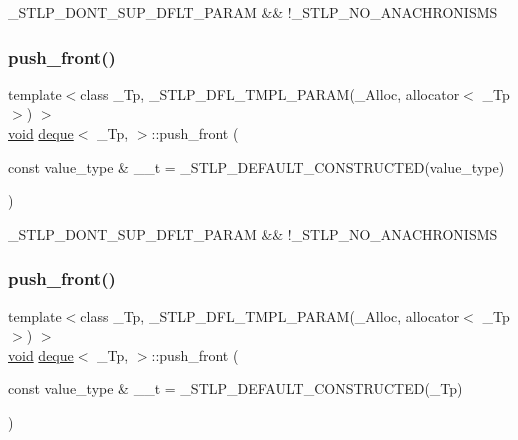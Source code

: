 \+\_\+\+S\+T\+L\+P\+\_\+\+D\+O\+N\+T\+\_\+\+S\+U\+P\+\_\+\+D\+F\+L\+T\+\_\+\+P\+A\+R\+AM \&\& !\+\_\+\+S\+T\+L\+P\+\_\+\+N\+O\+\_\+\+A\+N\+A\+C\+H\+R\+O\+N\+I\+S\+MS \mbox{\label{classdeque_acb102fac10501dc695a496beca93a9da}} 
\subsubsection{\texorpdfstring{push\+\_\+front()}{push\_front()}\hspace{0.1cm}{\footnotesize\ttfamily [1/2]}}
{\footnotesize\ttfamily template$<$class \+\_\+\+Tp, \+\_\+\+S\+T\+L\+P\+\_\+\+D\+F\+L\+\_\+\+T\+M\+P\+L\+\_\+\+P\+A\+R\+A\+M(\+\_\+\+Alloc, allocator$<$ \+\_\+\+Tp $>$) $>$ \\
\hyperlink{interfacevoid}{void} \hyperlink{classdeque}{deque}$<$ \+\_\+\+Tp, $>$\+::push\+\_\+front (\begin{DoxyParamCaption}\item[{const value\+\_\+type \&}]{\+\_\+\+\_\+t = {\ttfamily \+\_\+STLP\+\_\+DEFAULT\+\_\+CONSTRUCTED(value\+\_\+type)} }\end{DoxyParamCaption})\hspace{0.3cm}{\ttfamily [inline]}}

\+\_\+\+S\+T\+L\+P\+\_\+\+D\+O\+N\+T\+\_\+\+S\+U\+P\+\_\+\+D\+F\+L\+T\+\_\+\+P\+A\+R\+AM \&\& !\+\_\+\+S\+T\+L\+P\+\_\+\+N\+O\+\_\+\+A\+N\+A\+C\+H\+R\+O\+N\+I\+S\+MS \mbox{\label{classdeque_a5b7c21146c392ff2959d3ebaf498cf48}} 
\subsubsection{\texorpdfstring{push\+\_\+front()}{push\_front()}\hspace{0.1cm}{\footnotesize\ttfamily [2/2]}}
{\footnotesize\ttfamily template$<$class \+\_\+\+Tp, \+\_\+\+S\+T\+L\+P\+\_\+\+D\+F\+L\+\_\+\+T\+M\+P\+L\+\_\+\+P\+A\+R\+A\+M(\+\_\+\+Alloc, allocator$<$ \+\_\+\+Tp $>$) $>$ \\
\hyperlink{interfacevoid}{void} \hyperlink{classdeque}{deque}$<$ \+\_\+\+Tp, $>$\+::push\+\_\+front (\begin{DoxyParamCaption}\item[{const value\+\_\+type \&}]{\+\_\+\+\_\+t = {\ttfamily \+\_\+STLP\+\_\+DEFAULT\+\_\+CONSTRUCTED(\+\_\+Tp)} }\end{DoxyParamCaption})\hspace{0.3cm}{\ttfamily [inline]}}


